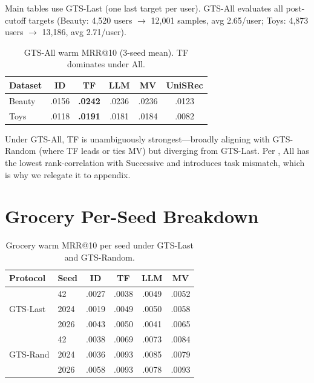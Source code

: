 \documentclass[sigconf,natbib=true,anonymous]{acmart}
\begin{document}
Main tables use GTS-Last (one last target per user).
GTS-All evaluates all post-cutoff targets (Beauty: 4{,}520 users $\to$ 12{,}001 samples, avg 2.65/user; Toys: 4{,}873 users $\to$ 13{,}186, avg 2.71/user).

\begin{table}[h]
\centering
\caption{GTS-All warm MRR@10 (3-seed mean).  TF dominates under All.}
\label{tab:gts-all}
\small
\begin{tabular}{@{}lccccc@{}}
\toprule
Dataset & ID & TF & LLM & MV & UniSRec \\
\midrule
Beauty & .0156 & \textbf{.0242} & .0236 & .0236 & .0123 \\
Toys   & .0118 & \textbf{.0191} & .0181 & .0184 & .0082 \\
\bottomrule
\end{tabular}
\end{table}

Under GTS-All, TF is unambiguously strongest---broadly aligning with GTS-Random (where TF leads or ties MV) but diverging from GTS-Last.
Per \citet{liang2024timetosplit}, All has the lowest rank-correlation with Successive and introduces task mismatch, which is why we relegate it to appendix.

\section{Grocery Per-Seed Breakdown}
\label{app:grocery}

\begin{table}[h]
\centering
\caption{Grocery warm MRR@10 per seed under GTS-Last and GTS-Random.}
\label{tab:grocery-perseed}
\small
\setlength{\tabcolsep}{3pt}
\begin{tabular}{@{}llcccc@{}}
\toprule
Protocol & Seed & ID & TF & LLM & MV \\
\midrule
\multirow{3}{*}{GTS-Last}
 & 42    & .0027 & .0038 & .0049 & .0052 \\
 & 2024  & .0019 & .0049 & .0050 & .0058 \\
 & 2026  & .0043 & .0050 & .0041 & .0065 \\
\midrule
\multirow{3}{*}{GTS-Rand}
 & 42    & .0038 & .0069 & .0073 & .0084 \\
 & 2024  & .0036 & .0093 & .0085 & .0079 \\
 & 2026  & .0058 & .0093 & .0078 & .0093 \\
\bottomrule
\end{tabular}
\end{table}
\end{document}
